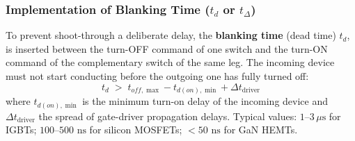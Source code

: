 \documentclass[11pt,a4paper]{article}
\begin{document}
\subsubsection{Implementation of Blanking Time ($t_d$ or $t_\Delta$)}
To prevent shoot-through a deliberate delay, the \textbf{blanking time} (dead time) $t_d$, is inserted between the turn-OFF command of one switch and the turn-ON command of the complementary switch of the same leg. The incoming device must not start conducting before the outgoing one has fully turned off:
\begin{equation}
t_d \;>\; t_{off,\max} - t_{d(on),\min} + \Delta t_{\text{driver}}
\end{equation}
where $t_{d(on),\min}$ is the minimum turn-on delay of the incoming device and $\Delta t_{\text{driver}}$ the spread of gate-driver propagation delays. Typical values: $1$--$3\,\mu\text{s}$ for IGBTs; $100$--$500\text{ ns}$ for silicon MOSFETs; $<50\text{ ns}$ for GaN HEMTs.
\end{document}
